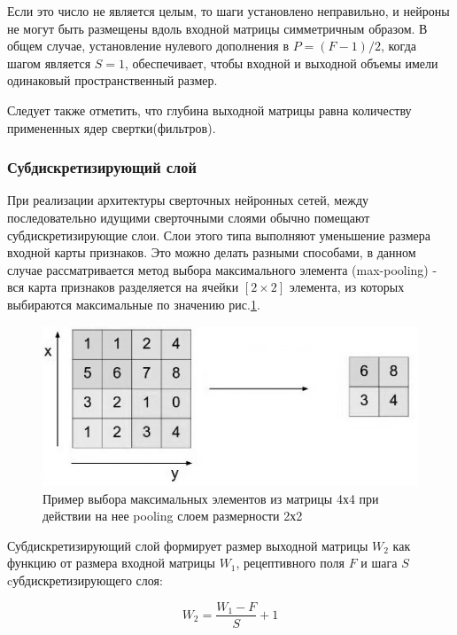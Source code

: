 \documentclass[14pt]{article}
\numberwithin{figure}{section}
\numberwithin{equation}{section}
\begin{document}
Если это число не является целым, то шаги установлено неправильно, и нейроны не могут быть размещены вдоль входной матрицы симметричным образом. В общем случае, установление нулевого дополнения в $P = (F - 1) / 2$, когда шагом является $S = 1$, обеспечивает, чтобы входной и выходной объемы имели одинаковый пространственный размер.

Следует также отметить, что глубина выходной матрицы равна количеству примененных ядер свертки(фильтров).

\subsubsection{Субдискретизирующий слой}

При реализации архитектуры сверточных нейронных сетей, между последовательно идущими сверточными слоями обычно помещают субдискретизирующие слои. Слои этого типа выполняют уменьшение размера входной карты признаков. Это можно делать разными способами, в данном случае рассматривается метод выбора максимального элемента (max-pooling) - вся карта признаков разделяется на ячейки $[2 \times 2]$ элемента, из которых выбираются максимальные по значению рис.\ref{ris:7}.

\begin{figure}[h]
	\begin{center}
		\includegraphics[scale=0.7] {7.JPG}
		\caption{Пример выбора максимальных элементов из матрицы 4х4 при действии на нее pooling слоем размерности 2х2}
		\label{ris:7}
	\end{center}
\end{figure}

Субдискретизирующий слой формирует размер выходной матрицы $W_2$ как функцию от размера входной матрицы $W_1$, рецептивного поля $F$ и шага $S$ cубдискретизирующего слоя\cite{Stanford}:

\begin{equation}
	W_2 = \frac{W_1 - F}{S} + 1
\end{equation}
\end{document}

